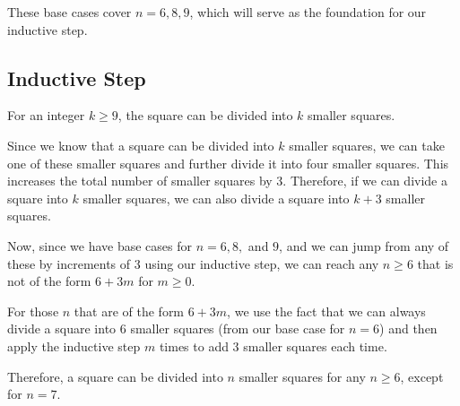 \documentclass{article}
\begin{document}
These base cases cover \( n = 6, 8, 9 \), which will serve as the foundation for our inductive step.

\subsection*{Inductive Step}
For an integer \( k \geq 9 \), the square can be divided into \( k \) smaller squares.

Since we know that a square can be divided into \( k \) smaller squares, we can take one of these smaller squares and further divide it into four smaller squares. This increases the total number of smaller squares by 3. Therefore, if we can divide a square into \( k \) smaller squares, we can also divide a square into \( k+3 \) smaller squares.

Now, since we have base cases for \( n = 6, 8, \) and \( 9 \), and we can jump from any of these by increments of 3 using our inductive step, we can reach any \( n \geq 6 \) that is not of the form \( 6+3m \) for \( m \geq 0 \).

For those \( n \) that are of the form \( 6+3m \), we use the fact that we can always divide a square into 6 smaller squares (from our base case for \( n=6 \)) and then apply the inductive step \( m \) times to add 3 smaller squares each time.

Therefore, a square can be divided into \( n \) smaller squares for any \( n \geq 6 \), except for \( n = 7 \).

\end{document}
